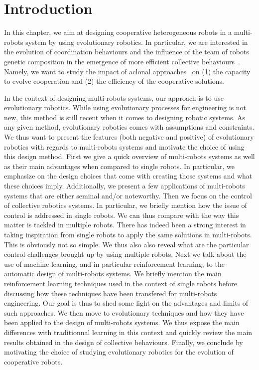 \section{Introduction}

  In this chapter, we aim at designing cooperative heterogeneous robots in a multi-robots system by using evolutionary robotics. In particular, we are interested in the evolution of coordination behaviours and the influence of the team of robots genetic composition in the emergence of more efficient collective behaviours~\parencite{Waibel2009}. Namely, we want to study the impact of aclonal approaches~\parencite{Quinn2001} on (1) the capacity to evolve cooperation and (2) the efficiency of the cooperative solutions.


  In the context of designing multi-robots systems, our approach is to use evolutionary robotics. While using evolutionary processes for engineering is not new, this method is still recent when it comes to designing robotic systems. As any given method, evolutionary robotics comes with assumptions and constraints. We thus want to present the features (both negative and positive) of evolutionary robotics with regards to multi-robots systems and motivate the choice of using this design method. First we give a quick overview of multi-robots systems as well as their main advantages when compared to single robots. In particular, we emphasize on the design choices that come with creating those systems and what these choices imply. Additionally, we present a few applications of multi-robots systems that are either seminal and/or noteworthy. Then we focus on the control of collective robotics systems. In particular, we briefly mention how the issue of control is addressed in single robots. We can thus compare with the way this matter is tackled in multiple robots. There has indeed been a strong interest in taking inspiration from single robots to apply the same solutions in multi-robots. This is obviously not so simple. We thus also also reveal what are the particular control challenges brought up by using multiple robots. Next we talk about the use of machine learning, and in particular reinforcement learning, to the automatic design of multi-robots systems. We briefly mention the main reinforcement learning techniques used in the context of single robots before discussing how these techniques have been transfered for multi-robots engineering. Our goal is thus to shed some light on the advantages and limits of such approaches. We then move to evolutionary techniques and how they have been applied to the design of multi-robots systems. We thus expose the main differences with traditionnal learning in this context and quickly review the main results obtained in the design of collective behaviours. Finally, we conclude by motivating the choice of studying evolutionary robotics for the evolution of cooperative robots.


